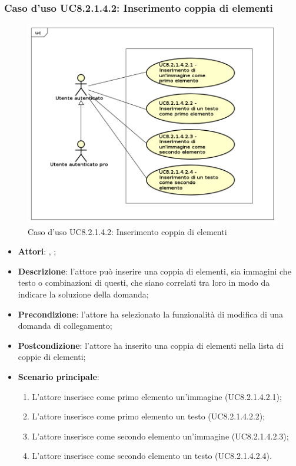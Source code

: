 	\subsubsection{Caso d'uso UC8.2.1.4.2: Inserimento coppia di elementi}
	\label{UC8.2.1.4.2}
	\begin{figure}[h]
		\centering
		\includegraphics[scale=0.5,keepaspectratio]{UML/UC8_2_1_4_2.png}
		\caption{Caso d'uso UC8.2.1.4.2: Inserimento coppia di elementi}
	\end{figure}
	\FloatBarrier
	\begin{itemize}
		\item \textbf{Attori}: \uau, \uaupro;
		\item \textbf{Descrizione}: l'attore può inserire una coppia di elementi, sia immagini che testo o combinazioni di questi, che siano correlati tra loro in modo da indicare la soluzione della domanda; 
		\item \textbf{Precondizione}: l'attore ha selezionato la funzionalità di modifica di una domanda di collegamento;
		\item \textbf{Postcondizione}: l'attore ha inserito una coppia di elementi nella lista di coppie di elementi; 
		\item \textbf{Scenario principale}: 
		\begin{enumerate}
			\item L'attore inserisce come primo elemento un'immagine (UC8.2.1.4.2.1);
			\item L'attore inserisce come primo elemento un testo (UC8.2.1.4.2.2);
			\item L'attore inserisce come secondo elemento un'immagine (UC8.2.1.4.2.3);
			\item L'attore inserisce come secondo elemento un testo (UC8.2.1.4.2.4).	
		\end{enumerate}
	\end{itemize}
	
